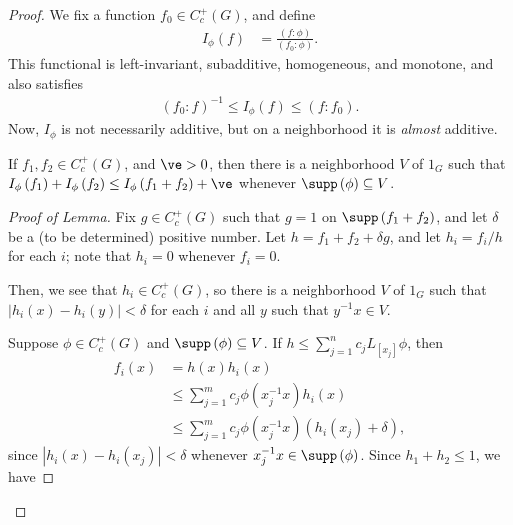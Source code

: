 \documentclass[10pt]{mypackage}
\begin{document}
\begin{proof}
  We fix a function $f_0\in C_c^{+}\left( G \right)$, and define
  \begin{align*}
    I_{\phi}\left( f \right) &= \frac{\left( f:\phi \right)}{\left( f_0:\phi \right)}.
  \end{align*}
  This functional is left-invariant, subadditive, homogeneous, and monotone, and also satisfies
  \begin{align*}
    \left( f_0:f \right)^{-1}\leq I_{\phi}\left( f \right)\leq \left( f:f_0 \right).
  \end{align*}
  Now, $I_{\phi}$ is not necessarily additive, but on a neighborhood it is \textit{almost} additive.
  \begin{lemma}
    If $f_1,f_2\in C_c^{+}\left( G \right)$, and $\ve > 0$, then there is a neighborhood $V$ of $1_G$ such that $I_{\phi}\left( f_1 \right) + I_{\phi}\left( f_2 \right) \leq I_{\phi}\left( f_1 + f_2 \right) + \ve$ whenever $\supp\left( \phi \right)\subseteq V$.
  \end{lemma}
  \begin{proof}[Proof of Lemma]
    Fix $g\in C_c^{+}\left( G \right)$ such that $g = 1$ on $\supp\left( f_1 + f_2 \right)$, and let $\delta$ be a (to be determined) positive number. Let $h = f_1 + f_2 + \delta g$, and let $h_i = f_i/h$ for each $i$; note that $h_i = 0$ whenever $f_i = 0$.\newline

    Then, we see that $h_i\in C_c^{+}\left( G \right)$, so there is a neighborhood $V$ of $1_G$ such that $\left\vert h_i\left( x \right) - h_i\left( y \right) \right\vert < \delta$ for each $i$ and all $y$ such that $y^{-1}x\in V$.\newline

    Suppose $\phi\in C_c^{+}\left( G \right)$ and $\supp\left( \phi \right) \subseteq V$. If $h\leq \sum_{j=1}^{n}c_jL_[x_j]\phi$, then
    \begin{align*}
      f_i(x) &= h(x)h_i(x)\\
             &\leq \sum_{j=1}^{m} c_j\phi\left( x_j^{-1}x \right)h_i(x)\\
             &\leq \sum_{j=1}^{m}c_j\phi\left( x_j^{-1}x \right)\left( h_i\left( x_j \right) + \delta \right),
    \end{align*}
    since $\left\vert h_i(x)-h_i\left( x_j \right) \right\vert < \delta$ whenever $x_j^{-1}x\in \supp\left( \phi \right)$. Since $h_1 + h_2 \leq 1$, we have
  \end{proof}
\end{proof}
\end{document}
